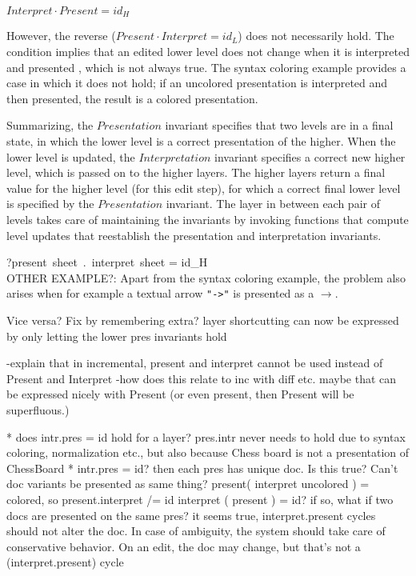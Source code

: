 \begin{small}\begin{math}
Interpret \cdot Present = id_{H}
\end{math}\end{small}


However, the reverse ($Present \cdot Interpret = id_{L}$) does not necessarily hold. The condition implies that an edited lower level does not change when it is interpreted and presented , which is not always true. The syntax coloring example provides a case in which it does not hold; if an uncolored presentation is interpreted and then presented, the result is a colored presentation. 
\ec

Summarizing, the $Presentation$ invariant specifies that two levels are in a final state, in which the lower level is a correct presentation of the higher. When the lower level is updated, the $Interpretation$ invariant specifies a correct new higher level, which is passed on to the higher layers. The higher layers return a final value for the higher level (for this edit step), for which a correct final lower level is specified by the $Presentation$ invariant. The layer in between each pair of levels takes care of maintaining the invariants by invoking functions that compute level updates that reestablish the presentation and interpretation invariants.


\bc
?present~sheet~.~interpret~sheet = id_{H}\\

OTHER EXAMPLE?: Apart from the syntax coloring example, the problem also arises when for example a textual arrow 
\verb|"->"| is presented as a $\rightarrow$. 

Vice versa? Fix by remembering extra?
 layer shortcutting can now be expressed by only letting the lower pres invariants hold

 -explain that in incremental, present and interpret cannot be used instead of Present and Interpret
 -how does this relate to inc with diff etc. maybe that can be expressed nicely with Present
 (or even present, then Present will be superfluous.)

* does   intr.pres = id hold for a layer? pres.intr never needs to hold due to syntax coloring, normalization etc., but also because Chess board is not a presentation of ChessBoard   
* intr.pres = id? then each pres has unique doc. Is this true? Can't doc variants be presented as same thing?
   present( interpret uncolored ) = colored, so present.interpret /= id
   interpret ( present ) = id? if so, what if two docs are presented on the same pres?
 it seems true, interpret.present cycles should not alter the doc. In case of ambiguity, the system should
 take care of conservative behavior. On an edit, the doc may change, but that's not a (interpret.present) cycle

